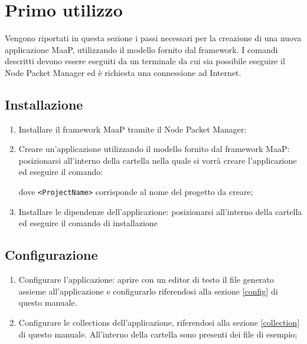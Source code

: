 \section{Primo utilizzo}

Vengono riportati in questa sezione i passi necessari per la creazione di una nuova applicazione MaaP, utilizzando il modello  fornito dal framework. I comandi descritti devono essere eseguiti da un terminale da cui sia possibile eseguire il Node Packet Manager ed è richiesta una connessione ad Internet.

\subsection{Installazione}

\begin{enumerate}
 	\item Installare il framework MaaP tramite il Node Packet Manager:
 	
 	\centerline{  }
 	
 	\item Creare un'applicazione utilizzando il modello fornito dal framework MaaP: posizionarsi all'interno della cartella nella quale si vorrà creare l'applicazione ed eseguire il comando:
 	
 	\centerline{  }
 
 	dove \texttt{<ProjectName>} corrisponde al nome del progetto da creare;
 	
 	\item Installare le dipendenze dell'applicazione: posizionarsi all'interno della cartella ed eseguire il comando di installazione
 
 	\centerline{  }
 	\centerline{  }
 	
\end{enumerate}

\subsection{Configurazione}

\begin{enumerate}

 	\item Configurare l'applicazione: aprire con un editor di testo il file  generato assieme all'applicazione e configurarlo riferendosi alla sezione \ref{config} di questo manuale.

 	\item Configurare le collections dell'applicazione, riferendosi alla sezione \ref{collection} di questo manuale. All'interno della cartella  sono presenti dei file  di esempio;

\end{enumerate} 

